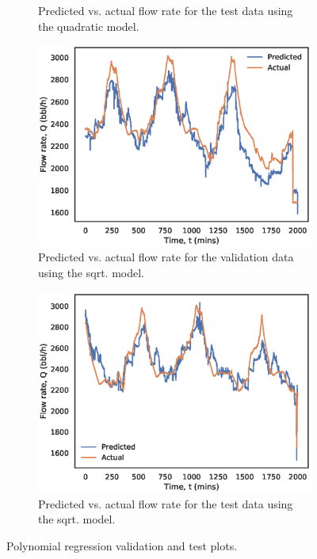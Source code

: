 \begin{figure}[h]
\begin{subfigure}[b]{0.45\textwidth}
         \caption{Predicted vs. actual flow rate for the test data using the quadratic model.}
         \label{fig:08quad_test}
     \end{subfigure}
     \begin{subfigure}[b]{0.45\textwidth}
         \centering
         \includegraphics[width=\textwidth]{images/08sqrt_validation.eps}
         \caption{Predicted vs. actual flow rate for the validation data using the sqrt. model.}
         \label{fig:08sqrt_validation}
     \end{subfigure}
     \begin{subfigure}[b]{0.45\textwidth}
         \centering
         \includegraphics[width=\textwidth]{images/08sqrt_test.eps}
         \caption{Predicted vs. actual flow rate for the test data using the sqrt. model.}
         \label{fig:08sqrt_test}
     \end{subfigure}
        \caption{Polynomial regression validation and test plots.}
        \label{fig:08PolynomialPlots}
\end{figure}

